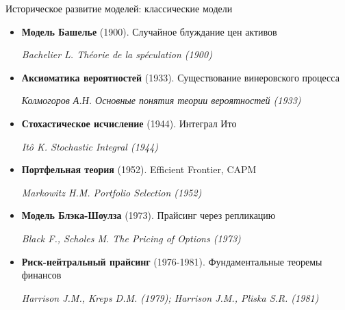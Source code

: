 \documentclass{beamer}
\begin{document}
\begin{frame}{Историческое развитие моделей: классические модели}
\footnotesize
\begin{itemize}
\item \textbf{Модель Башелье} (1900). Случайное блуждание цен активов \\ 
\begin{scriptsize}{\textit{Bachelier L. Théorie de la spéculation (1900)}}\end{scriptsize}

\item \textbf{Аксиоматика вероятностей} (1933). Существование винеровского процесса \\
\begin{scriptsize}{\textit{Колмогоров А.Н. Основные понятия теории вероятностей (1933)}}\end{scriptsize}

\item \textbf{Стохастическое исчисление} (1944). Интеграл Ито \\
\begin{scriptsize}{\textit{Itô K. Stochastic Integral (1944)}}\end{scriptsize}

\item \textbf{Портфельная теория} (1952). Efficient Frontier, CAPM \\
\begin{scriptsize}{\textit{Markowitz H.M. Portfolio Selection (1952)}}\end{scriptsize}

\item \textbf{Модель Блэка-Шоулза} (1973). Прайсинг через репликацию \\
\begin{scriptsize}{\textit{Black F., Scholes M. The Pricing of Options (1973)}}\end{scriptsize}

\item \textbf{Риск-нейтральный прайсинг} (1976-1981). Фундаментальные теоремы финансов\\
\begin{scriptsize}{\textit{Harrison J.M., Kreps D.M. (1979); Harrison J.M., Pliska S.R. (1981)}}\end{scriptsize}
\end{itemize}
\end{frame}
\end{document}
